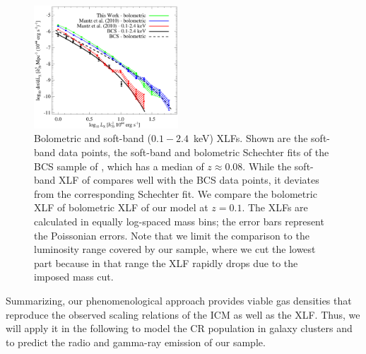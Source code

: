 \documentclass[traditabstract]{aa}
\begin{document}
\begin{figure}[t]
\centering
\includegraphics[width=0.48\textwidth]{figures/xlf.eps}
\caption{Bolometric and soft-band ($0.1-2.4$~keV) XLFs. Shown are the soft-band
  data points, the soft-band and bolometric Schechter fits of the BCS sample of
  \cite{1997ApJ...479L.101E}, which has a median of $z \approx 0.08$.  While the
  soft-band XLF of \cite{2010MNRAS.406.1773M} compares well with the BCS data
  points, it deviates from the corresponding Schechter fit. We compare the
  bolometric XLF of \cite{2010MNRAS.406.1773M} bolometric XLF of our model at
  $z=0.1$. The XLFs are calculated in equally log-spaced mass bins; the error
  bars represent the Poissonian errors. Note that we limit the comparison to the
  luminosity range covered by our sample, where we cut the lowest part because
  in that range the XLF rapidly drops due to the imposed mass cut.  }
\label{fig:XLF}
\end{figure}

Summarizing, our phenomenological approach provides viable gas densities that
reproduce the observed scaling relations of the ICM as well as the XLF. Thus, we
will apply it in the following to model the CR population in galaxy clusters and
to predict the radio and gamma-ray emission of our sample.


\end{document}
